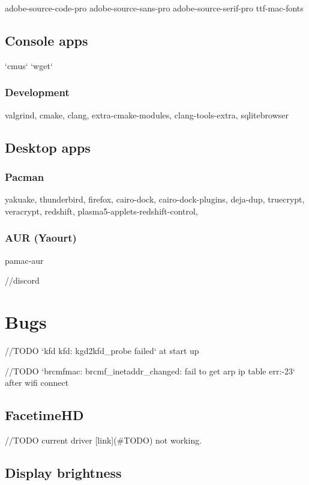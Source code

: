 adobe-source-code-pro
adobe-source-sans-pro
adobe-source-serif-pro
ttf-mac-fonts

\subsection{Console apps}

`cmus`
`wget`

\subsubsection{Development}

valgrind, cmake, clang, extra-cmake-modules, clang-tools-extra, 
sqlitebrowser

\subsection{Desktop apps}


\subsubsection{Pacman}

yakuake, thunderbird, firefox, cairo-dock, cairo-dock-plugins, deja-dup, truecrypt, veracrypt, 
redshift, plasma5-applets-redshift-control, 


\subsubsection{AUR (Yaourt)}

pamac-aur

//discord

\section{Bugs}

//TODO `kfd kfd: kgd2kfd\_probe failed` at start up

//TODO `brcmfmac: brcmf\_inetaddr\_changed: fail to get arp ip table err:-23` after wifi connect

\subsection{FacetimeHD}

//TODO current driver [link](#TODO) not working.

\subsection{Display brightness}

